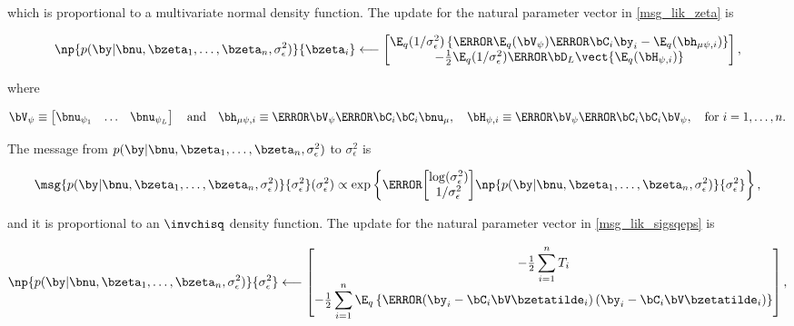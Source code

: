 \documentclass[12pt]{article}
\def\sigsqeps{\sigma^2_{\epsilon}}
\def\numu{\bnu_\mu}
\def\Vpsi{\bV_\psi}
\newcommand\nupsi[1]{\bnu_{\psi_{#1}}}
\newcommand\hmupsi[1]{\bh_{\mu \psi, i}}
\newcommand\Hpsi[1]{\bH_{\psi, i}}
\theoremstyle{plain}
\theoremstyle{definition}
\theoremstyle{remark}
\begin{document}
\noindent which is proportional to a multivariate normal density function.
The update for the natural parameter vector in \eqref{msg_lik_zeta} is

\begin{equation}
	\np{p (\by | \bnu, \bzeta_1, \dots, \bzeta_n, \sigsqeps)}{\bzeta_i}
		\longleftarrow
			\begin{bmatrix}
				\E_q (1/\sigsqeps) \left\{
					\T{\E_q (\Vpsi)} \T{\bC_i} \by_i - \E_q (\hmupsi{i})
				\right\} \\
				-\frac12 \E_q (1/\sigsqeps) \T{\bD_L} \vect \{ \E_q (\Hpsi{i}) \}
			\end{bmatrix},
\label{np_lik_zeta}
\end{equation}

\noindent where

\begin{equation}
	\Vpsi \equiv \begin{bmatrix}
		\nupsi{1} & \dots & \nupsi{L}
	\end{bmatrix} \quad
	\text{and} \quad
	\hmupsi{i} \equiv \T{\Vpsi} \T{\bC_i} \bC_i \numu, \quad
	\Hpsi{i} \equiv \T{\Vpsi} \T{\bC_i} \bC_i \Vpsi, \quad
	\text{for $i = 1, \dots, n$}.
\label{psi_related_defns}
\end{equation}

The message from $p (\by | \bnu, \bzeta_1, \dots, \bzeta_n, \sigsqeps)$ to $\sigsqeps$ is

\begin{equation}
	\msg{p (\by | \bnu, \bzeta_1, \dots, \bzeta_n, \sigsqeps)}{\sigsqeps} (\sigsqeps) \propto
		\exp \left\{
			\T{\begin{bmatrix}
				\log (\sigsqeps) \\
				1/\sigsqeps
			\end{bmatrix}}
			\np{p (\by | \bnu, \bzeta_1, \dots, \bzeta_n, \sigsqeps)}{\sigsqeps}
		\right\},
\label{msg_lik_sigsqeps}
\end{equation}

\noindent and it is proportional to an $\invchisq$ density function. The update for the natural parameter vector in
\eqref{msg_lik_sigsqeps} is

\begin{equation}
	\np{p (\by | \bnu, \bzeta_1, \dots, \bzeta_n, \sigsqeps)}{\sigsqeps}
		\longleftarrow
			\begin{bmatrix}
				-\frac12 \displaystyle\sum_{i=1}^n T_i \\
				-\frac12 \displaystyle\sum_{i=1}^n \E_q \left\{ \T{\left(
					\by_i - \bC_i \bV \bzetatilde_i
				\right)} \left(
					\by_i - \bC_i \bV \bzetatilde_i
				\right) \right\}
			\end{bmatrix},
\label{np_lik_sigsqeps}
\end{equation}
\end{document}
